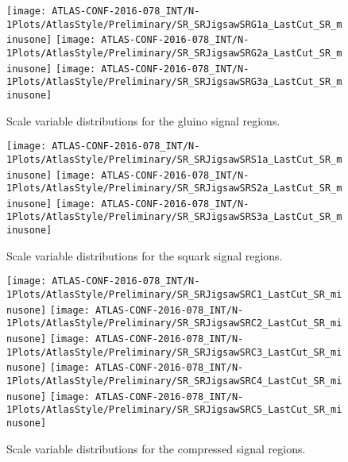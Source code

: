 \begin{figure}[tbp]
\begin{center}
\texttt{[image: ATLAS-CONF-2016-078\_INT/N-1Plots/AtlasStyle/Preliminary/SR\_SRJigsawSRG1a\_LastCut\_SR\_minusone]}
\texttt{[image: ATLAS-CONF-2016-078\_INT/N-1Plots/AtlasStyle/Preliminary/SR\_SRJigsawSRG2a\_LastCut\_SR\_minusone]}
\texttt{[image: ATLAS-CONF-2016-078\_INT/N-1Plots/AtlasStyle/Preliminary/SR\_SRJigsawSRG3a\_LastCut\_SR\_minusone]}
\end{center}
\caption{Scale variable distributions for the gluino signal regions.}
\label{fig:srg_scale}
\end{figure}

\begin{figure}[tbp]
\begin{center}
\texttt{[image: ATLAS-CONF-2016-078\_INT/N-1Plots/AtlasStyle/Preliminary/SR\_SRJigsawSRS1a\_LastCut\_SR\_minusone]}
\texttt{[image: ATLAS-CONF-2016-078\_INT/N-1Plots/AtlasStyle/Preliminary/SR\_SRJigsawSRS2a\_LastCut\_SR\_minusone]}
\texttt{[image: ATLAS-CONF-2016-078\_INT/N-1Plots/AtlasStyle/Preliminary/SR\_SRJigsawSRS3a\_LastCut\_SR\_minusone]}
\end{center}
\caption{Scale variable distributions for the squark signal regions.}
\label{fig:srs_scale}
\end{figure}

\begin{figure}[tbp]
\begin{center}
\texttt{[image: ATLAS-CONF-2016-078\_INT/N-1Plots/AtlasStyle/Preliminary/SR\_SRJigsawSRC1\_LastCut\_SR\_minusone]}
\texttt{[image: ATLAS-CONF-2016-078\_INT/N-1Plots/AtlasStyle/Preliminary/SR\_SRJigsawSRC2\_LastCut\_SR\_minusone]}
\texttt{[image: ATLAS-CONF-2016-078\_INT/N-1Plots/AtlasStyle/Preliminary/SR\_SRJigsawSRC3\_LastCut\_SR\_minusone]}
\texttt{[image: ATLAS-CONF-2016-078\_INT/N-1Plots/AtlasStyle/Preliminary/SR\_SRJigsawSRC4\_LastCut\_SR\_minusone]}
\texttt{[image: ATLAS-CONF-2016-078\_INT/N-1Plots/AtlasStyle/Preliminary/SR\_SRJigsawSRC5\_LastCut\_SR\_minusone]}
\end{center}
\caption{Scale variable distributions for the compressed signal regions.}
\label{fig:src_scale}
\end{figure}
